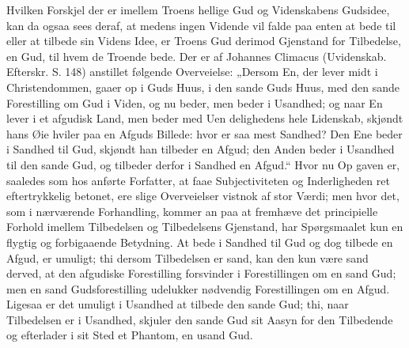 \documentclass[12pt]{book}
\newcommand{\opage}[1]{\marginnote{\footnotesize\textit{[#1]}}}
\begin{document}
Hvilken Forskjel der er imellem Troens hellige Gud
og Videnskabens Gudsidee, kan da ogsaa sees deraf, at
medens ingen Vidende vil falde paa enten at bede til
\opage{115}\setcounter{footnote}{0}%
eller at tilbede sin Videns Idee, er Troens Gud derimod
Gjenstand for Tilbedelse, en Gud, til hvem de Troende
bede. Der er af Johannes Climacus (Uvidenskab. Efterskr.
S. 148) anstillet følgende Overveielse: „Dersom En, der
lever midt i Christendommen, gaaer op i Guds Huus, i
den sande Guds Huus, med den sande Forestilling om
Gud i Viden, og nu beder, men beder i Usandhed; og
naar En lever i et afgudisk Land, men beder med Uen\-%
delighedens hele Lidenskab, skjøndt hans Øie hviler paa
en Afguds Billede: hvor er saa mest Sandhed? Den
Ene beder i Sandhed til Gud, skjøndt han tilbeder en
Afgud; den Anden beder i Usandhed til den sande Gud,
og tilbeder derfor i Sandhed en Afgud.“ Hvor nu Op\-%
gaven er, saaledes som hos anførte Forfatter, at faae
Subjectiviteten og Inderligheden ret eftertrykkelig betonet,
ere slige Overveielser vistnok af stor Værdi; men hvor
det, som i nærværende Forhandling, kommer an paa at
fremhæve det principielle Forhold imellem Tilbedelsen
og Tilbedelsens Gjenstand, har Spørgsmaalet kun en
flygtig og forbigaaende Betydning. At bede i Sandhed
til Gud og dog tilbede en Afgud, er umuligt; thi dersom
Tilbedelsen er sand, kan den kun være sand derved, at
den afgudiske Forestilling forsvinder i Forestillingen om
en sand Gud; men en sand Gudsforestilling udelukker
nødvendig Forestillingen om en Afgud. Ligesaa er det
umuligt i Usandhed at tilbede den sande Gud; thi, naar
Tilbedelsen er i Usandhed, skjuler den sande Gud sit
Aasyn for den Tilbedende og efterlader i sit Sted et
Phantom, en usand Gud.
\end{document}
